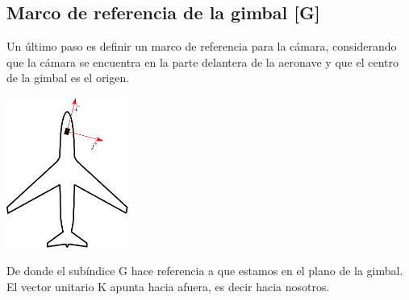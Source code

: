 \subsection{Marco de referencia de la gimbal [G]}
Un último paso es definir un marco de referencia para la cámara, considerando que la cámara se encuentra en la parte delantera de
la aeronave y que el centro de la gimbal es el origen.
\begin{center}
	\includegraphics[width=0.3\textwidth]{Contenido/Cuerpo/Capitulo3/Fig7.eps}
	\label{fig:ModeloMat:Fig1}
\end{center}
De donde el subíndice G hace referencia a que estamos en el plano de la gimbal. El vector unitario K apunta hacia afuera,
es decir hacia nosotros.



